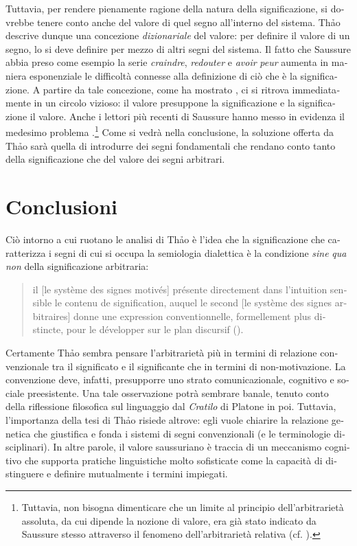 \documentclass[italian,output=paper,colorlinks,citecolor=brown]{../langscibook}
\begin{document}
\begin{otherlanguage}{italian}
\begin{enumerate}
Tuttavia, per rendere pienamente ragione della natura della significazione, si dovrebbe tenere conto anche del valore di quel segno all’interno del sistema. Th\textlatin{ả}o descrive dunque una concezione \textit{dizionariale} del valore: per definire il valore di un segno, lo si deve definire per mezzo di altri segni del sistema. Il fatto che Saussure abbia preso come esempio la serie \textit{craindre}, \textit{redouter} e \textit{avoir} \textit{peur} aumenta in maniera esponenziale le difficoltà connesse alla definizione di ciò che è la significazione. A partire da tale concezione, come ha mostrato \citet[74]{Eco1984}, ci si ritrova immediatamente in un circolo vizioso: il valore presuppone la significazione e la significazione il valore. Anche i lettori più recenti di Saussure hanno messo in evidenza il medesimo problema \citep[67]{Joseph2004}.\footnote{Tuttavia, non bisogna dimenticare che un limite al principio dell’arbitrarietà assoluta, da cui dipende la nozione di valore, era già stato indicato da Saussure stesso attraverso il fenomeno dell’arbitrarietà relativa (cf. \citealt[181--182]{Saussure1995}).} Come si vedrà nella conclusione, la soluzione offerta da Th\textlatin{ả}o sarà quella di introdurre dei segni fondamentali che rendano conto tanto della significazione che del valore dei segni arbitrari.
\end{enumerate}

\section{Conclusioni}

Ciò intorno a cui ruotano le analisi di Th\textlatin{ả}o è l’idea che la significazione che caratterizza i segni di cui si occupa la semiologia dialettica è la condizione \textit{sine} \textit{qua} \textit{non} della significazione arbitraria:

\begin{quote}
    il [le système des signes motivés] présente directement dans l’intuition sensible le contenu de signification, auquel le second [le système des signes arbitraires] donne une expression conventionnelle, formellement plus distincte, pour le développer sur le plan discursif (\citealt[40]{Thao1974}).
\end{quote}

Certamente Th\textlatin{ả}o sembra pensare l’arbitrarietà più in termini di relazione convenzionale tra il significato e il significante che in termini di non-motivazione. La convenzione deve, infatti, presupporre uno strato comunicazionale, cognitivo e sociale preesistente. Una tale osservazione potrà sembrare banale, tenuto conto della riflessione filosofica sul linguaggio dal \textit{Cratilo} di Platone in poi. Tuttavia, l’importanza della tesi di Th\textlatin{ả}o risiede altrove: egli vuole chiarire la relazione genetica che giustifica e fonda i sistemi di segni convenzionali (e le terminologie disciplinari). In altre parole, il valore saussuriano è traccia di un meccanismo cognitivo che supporta pratiche linguistiche molto sofisticate come la capacità di distinguere e definire mutualmente i termini impiegati. 


\end{otherlanguage}
\end{document}
